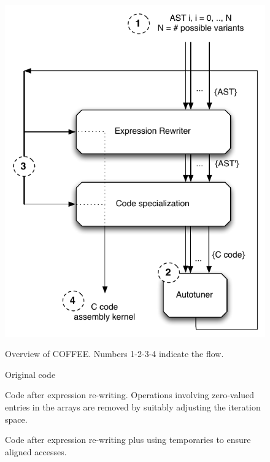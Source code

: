 \documentclass[a4paper]{article}
\begin{document}
\begin{itemize}
\begin{figure}
\begin{center}
\includegraphics[scale=1.0]{pictures/coffee-scheme}
\label{fig:newcoffee}\caption{Overview of COFFEE. Numbers 1-2-3-4 indicate the flow.}
\end{center}
\end{figure}

\begin{figure}
\label{original-code}\caption{Original code}
\scriptsize

\end{figure}

\begin{figure}
\label{zeros-code}\caption{Code after expression re-writing. Operations involving zero-valued entries in the arrays are removed by suitably adjusting the iteration space.}
\scriptsize

\end{figure}

\begin{figure}
\label{zeros-tmps-code}\caption{Code after expression re-writing plus using temporaries to ensure aligned accesses.}
\scriptsize

\end{figure}


\end{itemize}
\end{document}
